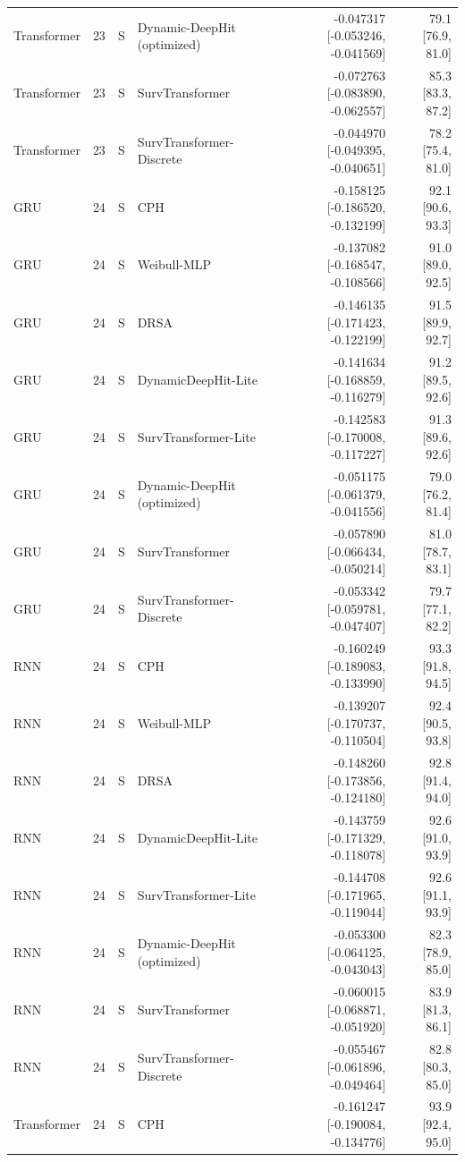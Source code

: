 \begin{longtable}{lll p{3.0cm} rr}
Transformer & 23 & S & Dynamic-DeepHit (optimized) & -0.047317 [-0.053246, -0.041569] & 79.1 [76.9, 81.0]\\
Transformer & 23 & S & SurvTransformer & -0.072763 [-0.083890, -0.062557] & 85.3 [83.3, 87.2]\\
Transformer & 23 & S & SurvTransformer-Discrete & -0.044970 [-0.049395, -0.040651] & 78.2 [75.4, 81.0]\\
GRU & 24 & S & CPH & -0.158125 [-0.186520, -0.132199] & 92.1 [90.6, 93.3]\\
GRU & 24 & S & Weibull-MLP & -0.137082 [-0.168547, -0.108566] & 91.0 [89.0, 92.5]\\
GRU & 24 & S & DRSA & -0.146135 [-0.171423, -0.122199] & 91.5 [89.9, 92.7]\\
GRU & 24 & S & DynamicDeepHit-Lite & -0.141634 [-0.168859, -0.116279] & 91.2 [89.5, 92.6]\\
GRU & 24 & S & SurvTransformer-Lite & -0.142583 [-0.170008, -0.117227] & 91.3 [89.6, 92.6]\\
GRU & 24 & S & Dynamic-DeepHit (optimized) & -0.051175 [-0.061379, -0.041556] & 79.0 [76.2, 81.4]\\
GRU & 24 & S & SurvTransformer & -0.057890 [-0.066434, -0.050214] & 81.0 [78.7, 83.1]\\
GRU & 24 & S & SurvTransformer-Discrete & -0.053342 [-0.059781, -0.047407] & 79.7 [77.1, 82.2]\\
RNN & 24 & S & CPH & -0.160249 [-0.189083, -0.133990] & 93.3 [91.8, 94.5]\\
RNN & 24 & S & Weibull-MLP & -0.139207 [-0.170737, -0.110504] & 92.4 [90.5, 93.8]\\
RNN & 24 & S & DRSA & -0.148260 [-0.173856, -0.124180] & 92.8 [91.4, 94.0]\\
RNN & 24 & S & DynamicDeepHit-Lite & -0.143759 [-0.171329, -0.118078] & 92.6 [91.0, 93.9]\\
RNN & 24 & S & SurvTransformer-Lite & -0.144708 [-0.171965, -0.119044] & 92.6 [91.1, 93.9]\\
RNN & 24 & S & Dynamic-DeepHit (optimized) & -0.053300 [-0.064125, -0.043043] & 82.3 [78.9, 85.0]\\
RNN & 24 & S & SurvTransformer & -0.060015 [-0.068871, -0.051920] & 83.9 [81.3, 86.1]\\
RNN & 24 & S & SurvTransformer-Discrete & -0.055467 [-0.061896, -0.049464] & 82.8 [80.3, 85.0]\\
Transformer & 24 & S & CPH & -0.161247 [-0.190084, -0.134776] & 93.9 [92.4, 95.0]\\

\end{longtable}
